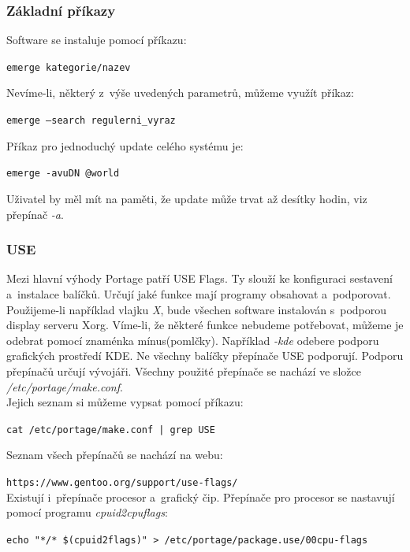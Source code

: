 \documentclass[12pt,a4paper,twoside,]{article}
\begin{document}
{{{{{{{\subsubsection{\textsf{Základní příkazy}}
Software se instaluje pomocí příkazu:  

 \texttt{emerge kategorie/nazev} 
 
\hspace{-1.5em}Nevíme-li, některý z~výše uvedených parametrů, můžeme využít příkaz:

\texttt{emerge --search regulerni\_vyraz} 

\hspace{-1.5em}Příkaz pro jednoduchý update celého systému je:

\texttt{emerge -avuDN @world}

\hspace*{-1.5em}Uživatel by měl mít na paměti, že update může trvat až desítky hodin, viz přepínač \textit{-a}. %

\subsubsection{\textsf{USE}}
Mezi hlavní výhody Portage patří USE Flags. Ty slouží ke konfiguraci sestavení a~instalace balíčků. Určují jaké funkce mají programy obsahovat a~podporovat.\\
Použijeme-li například vlajku \textit{X}, bude všechen software instalován s~podporou display serveru Xorg. Víme-li, že některé funkce nebudeme potřebovat, můžeme je odebrat pomocí znaménka mínus(pomlčky). Například \textit{-kde} odebere podporu grafických prostředí KDE.
Ne všechny balíčky přepínače USE podporují. Podporu přepínačů určují vývojáři.
Všechny použité přepínače se nachází ve složce \textit{/etc/portage/make.conf}. \\
Jejich seznam si můžeme vypsat pomocí příkazu:

\texttt{cat /etc/portage/make.conf | grep USE}

\hspace{-1.5em}Seznam všech přepínačů se nachází na webu:

\texttt{https://www.gentoo.org/support/use-flags/}\\

\hspace{-1.5em}Existují i~přepínače procesor a~grafický čip. Přepínače pro procesor se nastavují pomocí programu \textit{cpuid2cpuflags}:


\texttt{echo "*/* \$(cpuid2flags)" > /etc/portage/package.use/00cpu-flags}\\

}}}}}}}
\end{document}
